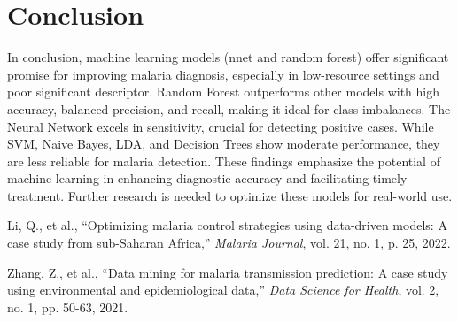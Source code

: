 \documentclass[12pt,a4paper]{article}
\begin{document}
\section{Conclusion}
In conclusion, machine learning models (nnet and random forest) offer significant promise for improving malaria diagnosis, especially in low-resource settings and poor significant descriptor. Random Forest outperforms other models with high accuracy, balanced precision, and recall, making it ideal for class imbalances. The Neural Network excels in sensitivity, crucial for detecting positive cases. While SVM, Naive Bayes, LDA, and Decision Trees show moderate performance, they are less reliable for malaria detection. These findings emphasize the potential of machine learning in enhancing diagnostic accuracy and facilitating timely treatment. Further research is needed to optimize these models for real-world use.

















\newpage
\begin{thebibliography}{2}
		
		Li, Q., et al., ``Optimizing malaria control strategies using data-driven models: A case study from sub-Saharan Africa,'' \textit{Malaria Journal}, vol. 21, no. 1, p. 25, 2022.
		
		Zhang, Z., et al., ``Data mining for malaria transmission prediction: A case study using environmental and epidemiological data,'' \textit{Data Science for Health}, vol. 2, no. 1, pp. 50-63, 2021.
	
\end{thebibliography}
\end{document}
